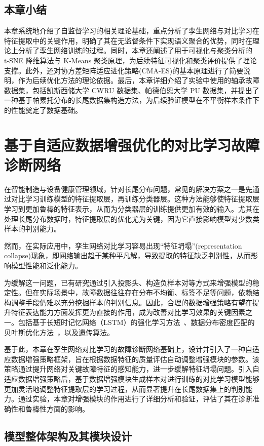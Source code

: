\documentclass[master]{thesis-uestc}
\begin{document}
\section{本章小结}
本章系统地介绍了自监督学习的相关理论基础，重点分析了孪生网络与对比学习在特征提取中的关键作用，明确了其在无监督条件下实现语义聚合的优势，同时在理论上分析了孪生网络训练的过程。同时，本章还阐述了用于可视化与聚类分析的 t-SNE 降维算法与 K-Means 聚类原理，为后续特征可视化和聚类评价提供了理论支撑。此外，还对协方差矩阵适应进化策略(CMA-ES)的基本原理进行了简要说明，作为后续优化方法的理论依据。最后，本章详细介绍了实验中使用的轴承故障数据集，包括凯斯西储大学 CWRU 数据集、帕德伯恩大学 PU 数据集，并提出了一种基于帕累托分布的长尾数据集构造方法，为后续验证模型在不平衡样本条件下的性能奠定了数据基础。

\chapter{基于自适应数据增强优化的对比学习故障诊断网络}
在智能制造与设备健康管理领域，针对长尾分布问题，常见的解决方案之一是先通过对比学习训练模型的特征提取层，再训练分类器层。这种方法能够使特征提取层学习到更加鲁棒的特征表示，从而为分类器层的训练提供更加有效的输入。尤其在处理长尾分布数据时，特征提取层的优化尤为关键，因为它直接影响模型对少数类样本的判别能力。

然而，在实际应用中，孪生网络对比学习容易出现“特征坍塌”(representation collapse)现象，即网络输出趋于某种平凡解，导致提取的特征缺乏判别性，从而影响模型性能和泛化能力。

为缓解这一问题，已有研究通过引入投影头、构造负样本对等方式来增强模型的稳定性。但在实际场景中，故障数据往往存在分布不均衡、标签不足等问题，依赖结构调整手段仍难以充分挖掘样本的判别信息。因此，合理的数据增强策略有望在提升特征表达能力方面发挥更为直接的作用，成为改善对比学习效果的关键因素之一。包括基于长短时记忆网络（LSTM）的强化学习方法~、数据分布密度匹配的贝叶斯优化方法~，以及遗传算法。


基于此，本章在孪生网络对比学习的故障诊断网络基础上，设计并引入了一种自适应数据增强策略框架，旨在根据数据特征的质量评估自动调整增强模块的参数。该策略通过提升网络对关键故障特征的感知能力，进一步缓解特征坍塌问题。引入自适应数据增强策略后，基于数据增强模块生成样本对进行训练的对比学习模型能够更加灵活地调整特征提取层的学习过程，从而显著提升在长尾数据集上的判别能力。通过实验，本章对增强模块的作用进行了详细分析和验证，评估了其在诊断准确性和鲁棒性方面的影响。


\section{模型整体架构及其模块设计}
\end{document}
